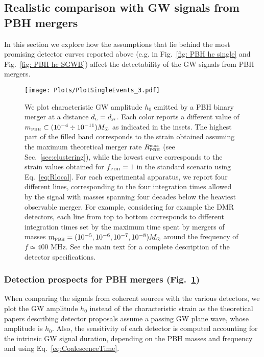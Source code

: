 \documentclass[11pt,a4paper]{article}
\newcommand{\PBH}{\text{\tiny PBH}}
\begin{document}
\subsection{Realistic comparison with GW signals from PBH mergers}
\label{sec:Comparison}

In this section we explore how the assumptions that lie behind the most promising detector curves reported above (e.g. in Fig.~\ref{fig: PBH hc single} and Fig.~\ref{fig: PBH hc SGWB}) affect the detectability of the GW signals from PBH mergers. 



\begin{figure}[t!]
\centering
\texttt{[image: Plots/PlotSingleEvents\_3.pdf]}
\caption{
We plot characteristic GW amplitude $h_0$ emitted by a PBH binary merger at a distance $d_\text{\tiny L}=d_\text{\tiny yr}$.
Each color reports a different value of $m_\text{\tiny PBH} \subset (10^{-4}\div 10^{-11}) M_\odot$ as indicated in the insets. The highest part of the filled band corresponds to the strain obtained assuming the maximum theoretical merger rate $R_\PBH^\text{\tiny max}$ (see Sec.~\ref{sec:clustering}), 
while the lowest curve corresponds to the strain values obtained for $f_\text{\tiny{PBH}} = 1$ in the standard scenario using Eq.~\eqref{eq:Rlocal}. 
For each experimental apparatus, we report four different lines, corresponding to the four integration times allowed by the signal with masses spanning four decades below the heaviest observable merger. 
For example, considering for example the DMR detectors, each line from top to bottom corresponds to different integration times set by the maximum time spent by mergers of masses $m_\PBH=(10^{-5}, 10^{-6}, 10^{-7},10^{-8}) M_\odot$ around the frequency of $f\simeq 400$ MHz. See the main text for a complete description of the detector specifications.
}\label{fig:PlotSingleEvents}
\end{figure}



\subsubsection{Detection prospects for PBH mergers (Fig.~\ref{fig:PlotSingleEvents})}

When comparing the signals from coherent sources with the various detectors, we plot the GW amplitude $h_0$ instead of the characteristic strain as the theoretical papers describing detector proposals assume a passing GW plane wave, whose amplitude is $h_0$.
Also, the sensitivity of each detector is computed accounting for the intrinsic GW signal duration, depending on the PBH masses and frequency and using Eq.~\eqref{eq:CoalescenceTime}.
\end{document}
